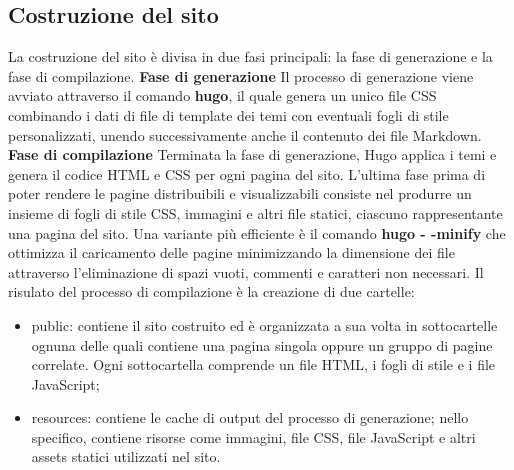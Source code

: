 \documentclass[target=bach,aauheader=]{thud}
\begin{document}
\subsection{Costruzione del sito}
La costruzione del sito è divisa in due fasi principali: la fase di generazione e la fase di compilazione.
\newline
\newline
\textbf{{\fontsize{12}{14}\selectfont Fase di generazione}}
\newline \newline
Il processo di generazione viene avviato attraverso il comando \textbf{hugo}, il quale genera un unico file CSS combinando i dati di file di template dei temi con eventuali fogli di stile personalizzati, unendo successivamente anche il contenuto dei file Markdown.
\newline \newline
\textbf{{\fontsize{12}{14}\selectfont Fase di compilazione}}
\newline \newline
Terminata la fase di generazione, Hugo applica i temi e genera il codice HTML e CSS per ogni pagina del sito. L'ultima fase prima di poter rendere le pagine distribuibili e visualizzabili consiste nel produrre un insieme di fogli di stile CSS, immagini e
altri file statici, ciascuno rappresentante una pagina del sito. 
Una variante più efficiente è il comando \textbf{hugo - -minify} che ottimizza il caricamento delle pagine minimizzando la dimensione dei file attraverso l'eliminazione di spazi vuoti, commenti e caratteri non necessari.
\newline
Il risulato del processo di compilazione è la creazione di due cartelle:
\begin{itemize}
    \item public: contiene il sito costruito ed è organizzata a sua volta in sottocartelle ognuna delle quali contiene una pagina singola oppure un gruppo di pagine correlate. Ogni sottocartella comprende un file HTML, i fogli di stile e i file JavaScript;
    \item resources: contiene le cache di output del processo di generazione; nello specifico, contiene risorse come immagini, file CSS, file JavaScript e altri assets statici utilizzati nel sito.
\end{itemize}

\end{document}
